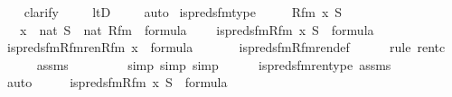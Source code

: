 \begin{isabellebody}
\ \ \isamarkupfalse%
\ clarify\ \isanewline
\ \ \isamarkupfalse%
\ ltD\ \isanewline
\ \ \isamarkupfalse%
\ auto%
\endisatagproof
{\isafoldproof}%
%
\isadelimproof
\isanewline
%
\endisadelimproof
\isanewline
{}\isamarkupfalse%
\ is{\isacharunderscore}{\kern0pt}preds{\isacharunderscore}{\kern0pt}fm{\isacharunderscore}{\kern0pt}type\ {\isacharcolon}{\kern0pt}\ \isanewline
\ \ \ Rfm\ x\ S\ \isanewline
\ \ \ {\isachardoublequoteopen}x\ {\isasymin}\ nat{\isachardoublequoteclose}\ {\isachardoublequoteopen}S\ {\isasymin}\ nat{\isachardoublequoteclose}\ {\isachardoublequoteopen}Rfm\ {\isasymin}\ formula{\isachardoublequoteclose}\ \isanewline
\ \ \ {\isachardoublequoteopen}is{\isacharunderscore}{\kern0pt}preds{\isacharunderscore}{\kern0pt}fm{\isacharparenleft}{\kern0pt}Rfm{\isacharcomma}{\kern0pt}\ x{\isacharcomma}{\kern0pt}\ S{\isacharparenright}{\kern0pt}\ {\isasymin}\ formula{\isachardoublequoteclose}\isanewline
%
\isadelimproof
%
\endisadelimproof
%
\isatagproof
{}\isamarkupfalse%
\ {\isacharminus}{\kern0pt}\isanewline
\ \ \isamarkupfalse%
\ {\isachardoublequoteopen}is{\isacharunderscore}{\kern0pt}preds{\isacharunderscore}{\kern0pt}fm{\isacharunderscore}{\kern0pt}Rfm{\isacharunderscore}{\kern0pt}ren{\isacharparenleft}{\kern0pt}Rfm{\isacharcomma}{\kern0pt}\ x{\isacharparenright}{\kern0pt}\ {\isasymin}\ formula{\isachardoublequoteclose}\ \isanewline
\ \ \ \ \isamarkupfalse%
\ is{\isacharunderscore}{\kern0pt}preds{\isacharunderscore}{\kern0pt}fm{\isacharunderscore}{\kern0pt}Rfm{\isacharunderscore}{\kern0pt}ren{\isacharunderscore}{\kern0pt}def\ \isanewline
\ \ \ \ \isamarkupfalse%
{\isacharparenleft}{\kern0pt}rule\ ren{\isacharunderscore}{\kern0pt}tc{\isacharparenright}{\kern0pt}\isanewline
\ \ \ \ \isamarkupfalse%
\ assms\ \isanewline
\ \ \ \ \ \ \ \isamarkupfalse%
{\isacharparenleft}{\kern0pt}simp{\isacharcomma}{\kern0pt}\ simp{\isacharcomma}{\kern0pt}\ simp{\isacharparenright}{\kern0pt}\isanewline
\ \ \ \ \isamarkupfalse%
\ is{\isacharunderscore}{\kern0pt}preds{\isacharunderscore}{\kern0pt}fm{\isacharunderscore}{\kern0pt}ren{\isacharunderscore}{\kern0pt}type\ assms\ \isanewline
\ \ \ \ \isamarkupfalse%
\ auto\isanewline
\ \ \isamarkupfalse%
\ \isamarkupfalse%
\ {\isachardoublequoteopen}is{\isacharunderscore}{\kern0pt}preds{\isacharunderscore}{\kern0pt}fm{\isacharparenleft}{\kern0pt}Rfm{\isacharcomma}{\kern0pt}\ x{\isacharcomma}{\kern0pt}\ S{\isacharparenright}{\kern0pt}\ {\isasymin}\ formula{\isachardoublequoteclose}\isanewline

\end{isabellebody}

